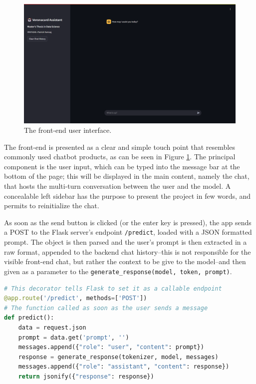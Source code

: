 \begin{figure}[h]
    \centering    
    \includegraphics[width=1\textwidth]{images/streamlit-app.png}
    \caption{The front-end user interface.}
    \label{fig:streamlit-app}
\end{figure}

The front-end is presented as a clear and simple touch point that resembles commonly used chatbot products, as can be seen in Figure \ref{fig:streamlit-app}. The principal component is the user input, which can be typed into the message bar at the bottom of the page; this will be displayed in the main content, namely the chat, that hosts the multi-turn conversation between the user and the model. A concealable left sidebar has the purpose to present the project in few words, and permits to reinitialize the chat.

As soon as the send button is clicked (or the enter key is pressed), the app sends a POST to the Flask server's endpoint \verb|/predict|, loaded with a JSON formatted prompt. The object is then parsed and the user's prompt is then extracted in a raw format, appended to the backend chat history--this is not responsible for the visible front-end chat, but rather the context to be give to the model--and then given as a parameter to the \texttt{generate\_response(model, token, prompt)}.

\begin{center}
\begin{minipage}{0.7\textwidth}
\begin{lstlisting}[language=Python, frame=single, caption=Predict Flask API.]
# This decorator tells Flask to set it as a callable endpoint
@app.route('/predict', methods=['POST'])
# The function called as soon as the user sends a message
def predict():
    data = request.json
    prompt = data.get('prompt', '')
    messages.append({"role": "user", "content": prompt})
    response = generate_response(tokenizer, model, messages)
    messages.append({"role": "assistant", "content": response})
    return jsonify({"response": response})
\end{lstlisting}
\label{lst:predict-api}
\end{minipage}
\end{center}

